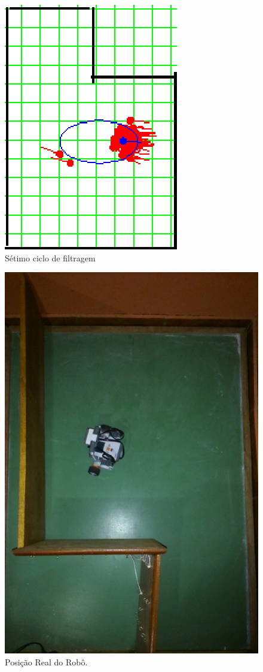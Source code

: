 \begin{figure}[H]
  \centering
  \includegraphics[scale=1]{figuras/cen2_ex1/8.eps}
  \caption[Sétimo Ciclo de Filtragem]{Sétimo ciclo de filtragem}
  \label{img:cen2_ex1_8}
\end{figure}

\begin{figure}[H]
  \centering
  \includegraphics[scale=1]{figuras/cen2_ex1/real.eps}
  \caption[Posição Real do Robô]{Posição Real do Robô.}
  \label{img:cen2_ex1_real}
\end{figure}

